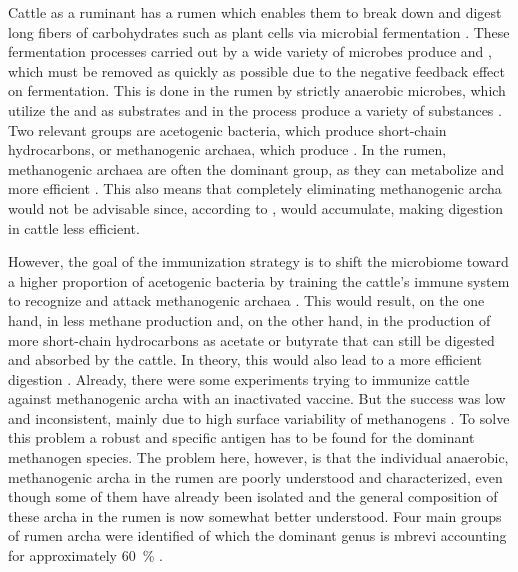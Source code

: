 Cattle as a ruminant has a rumen which enables them to break down and digest long fibers of carbohydrates such as plant cells via microbial fermentation \parencite{mossMethaneProductionRuminants2000, epaInventoryUSGreenhouse2024}. These fermentation processes carried out by a wide variety of microbes produce  and , which must be removed as quickly as possible due to the negative feedback effect on fermentation. This is done in the rumen by strictly anaerobic microbes, which utilize the  and  as substrates and in the process produce a variety of substances \parencite{mossMethaneProductionRuminants2000}.  Two relevant groups are acetogenic bacteria, which produce short-chain hydrocarbons, or  methanogenic archaea, which produce  \parencite{boadiMitigationStrategiesReduce2004, garnettGreenhousegasAbatementAustralian2024}. 
In the rumen, methanogenic archaea are often the dominant group, as they can metabolize  and  more efficient \parencite{mossMethaneProductionRuminants2000}. This also means that completely eliminating methanogenic \gls{archa} would not be advisable since, according to \textcite{morvanEstablishmentHydrogenutilizingBacteria1994},  would accumulate, making digestion in cattle less efficient.

However, the goal of the immunization strategy is to shift the microbiome toward a higher proportion of acetogenic bacteria by training the cattle’s immune system to recognize and attack methanogenic archaea \parencite{malyuginaMitigationStrategiesMethane2025}. This would result, on the one hand, in less methane production and, on the other hand, in the production of more short-chain hydrocarbons as acetate or butyrate that can still be digested and absorbed by the cattle. In theory, this would also lead to a more efficient digestion \parencite{boadiMitigationStrategiesReduce2004, mossMethaneProductionRuminants2000, malyuginaMitigationStrategiesMethane2025}.
Already, there were some experiments trying to immunize cattle against methanogenic \gls{archa} with an inactivated vaccine. But the success was low and inconsistent, mainly due to high surface variability of methanogens  \parencite{wrightReducingMethaneEmissions2004, malyuginaMitigationStrategiesMethane2025}. To solve this problem a robust and specific antigen has to be found for the dominant methanogen species. 
The problem here, however, is that the individual anaerobic, methanogenic \gls{archa} in the rumen are poorly understood and characterized, even though some of them have already been isolated and the general composition of these \gls{archa} in the rumen is now somewhat better understood. Four main groups of rumen \gls{archa} were identified of which the dominant genus is \acrlong{mbrevi} accounting for approximately 60~\% \citep{baca-gonzalezAreVaccinesSolution2020}.

